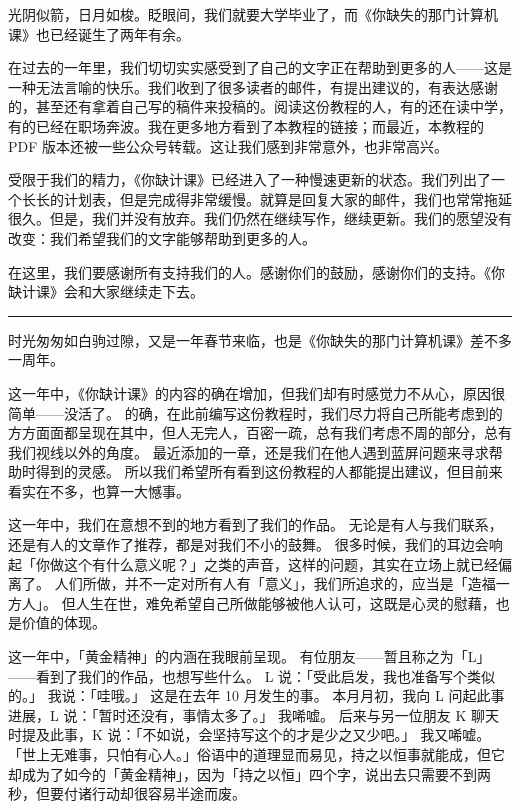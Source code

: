 光阴似箭，日月如梭。眨眼间，我们就要大学毕业了，而《你缺失的那门计算机课》也已经诞生了两年有余。

在过去的一年里，我们切切实实感受到了自己的文字正在帮助到更多的人——这是一种无法言喻的快乐。我们收到了很多读者的邮件，有提出建议的，有表达感谢的，甚至还有拿着自己写的稿件来投稿的。阅读这份教程的人，有的还在读中学，有的已经在职场奔波。我在更多地方看到了本教程的链接；而最近，本教程的 PDF 版本还被一些公众号转载。这让我们感到非常意外，也非常高兴。

受限于我们的精力，《你缺计课》已经进入了一种慢速更新的状态。我们列出了一个长长的计划表，但是完成得非常缓慢。就算是回复大家的邮件，我们也常常拖延很久。但是，我们并没有放弃。我们仍然在继续写作，继续更新。我们的愿望没有改变：我们希望我们的文字能够帮助到更多的人。

在这里，我们要感谢所有支持我们的人。感谢你们的鼓励，感谢你们的支持。《你缺计课》会和大家继续走下去。


\begin{center}\rule{0.5\linewidth}{0.5pt}\end{center}

时光匆匆如白驹过隙，又是一年春节来临，也是《你缺失的那门计算机课》差不多一周年。

这一年中，《你缺计课》的内容的确在增加，但我们却有时感觉力不从心，原因很简单——没活了。
的确，在此前编写这份教程时，我们尽力将自己所能考虑到的方方面面都呈现在其中，但人无完人，百密一疏，总有我们考虑不周的部分，总有我们视线以外的角度。
最近添加的一章，还是我们在他人遇到蓝屏问题来寻求帮助时得到的灵感。
所以我们希望所有看到这份教程的人都能提出建议，但目前来看实在不多，也算一大憾事。

这一年中，我们在意想不到的地方看到了我们的作品。
无论是有人与我们联系，还是有人的文章作了推荐，都是对我们不小的鼓舞。
很多时候，我们的耳边会响起「你做这个有什么意义呢？」之类的声音，这样的问题，其实在立场上就已经偏离了。
人们所做，并不一定对所有人有「意义」，我们所追求的，应当是「造福一方人」。
但人生在世，难免希望自己所做能够被他人认可，这既是心灵的慰藉，也是价值的体现。

这一年中，「黄金精神」的内涵在我眼前呈现。
有位朋友——暂且称之为「L」——看到了我们的作品，也想写些什么。
L 说：「受此启发，我也准备写个类似的。」
我说：「哇哦。」
这是在去年 10 月发生的事。
本月月初，我向 L 问起此事进展，L 说：「暂时还没有，事情太多了。」
我唏嘘。
后来与另一位朋友 K 聊天时提及此事，K 说：「不如说，会坚持写这个的才是少之又少吧。」
我又唏嘘。
「世上无难事，只怕有心人。」俗语中的道理显而易见，持之以恒事就能成，但它却成为了如今的「黄金精神」，因为「持之以恒」四个字，说出去只需要不到两秒，但要付诸行动却很容易半途而废。

